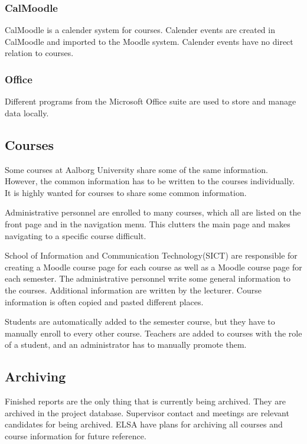 \subsubsection*{CalMoodle}
CalMoodle is a calender system for courses.
Calender events are created in CalMoodle and imported to the Moodle system.
Calender events have no direct relation to courses.

\subsubsection*{Office}
Different programs from the Microsoft Office suite are used to store and manage data locally.

\subsection*{Courses}
Some courses at Aalborg University share some of the same information.
However, the common information has to be written to the courses individually.
It is highly wanted for courses to share some common information.

Administrative personnel are enrolled to many courses, which all are listed on the front page and in the navigation menu.
This clutters the main page and makes navigating to a specific course difficult.

School of Information and Communication Technology(SICT) are responsible for creating a Moodle course page for each course as well as a Moodle course page for each semester. 
The administrative personnel write some general information to the courses.
Additional information are written by the lecturer.
Course information is often copied and pasted different places.

Students are automatically added to the semester course, but they have to manually enroll to every other course.
Teachers are added to courses with the role of a student, and an administrator has to manually promote them.

\subsection*{Archiving}
Finished reports are the only thing that is currently being archived.
They are archived in the project database.
Supervisor contact and meetings are relevant candidates for being archived.
ELSA have plans for archiving all courses and course information for future reference.